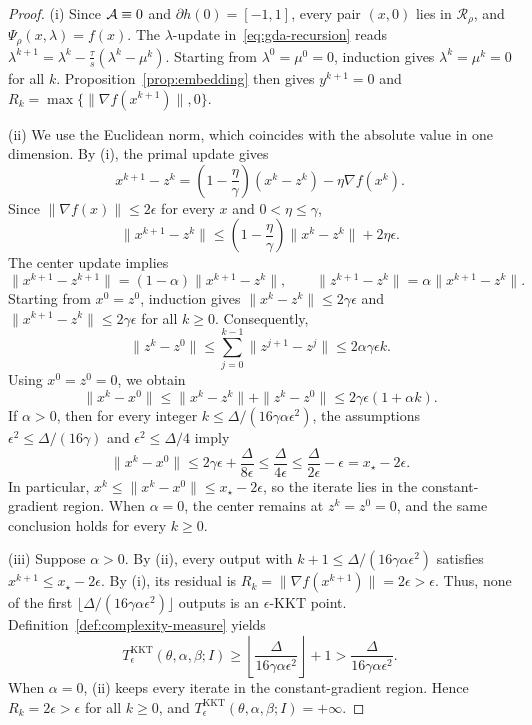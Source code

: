 \begin{proof}
(i) Since \(\mathcal{A}\equiv0\) and \(\partial h(0)=[-1,1]\), every pair
\((x,0)\) lies in \(\mathcal R_\rho\), and \(\Psi_\rho(x,\lambda)=f(x)\). The
\(\lambda\)-update in~\eqref{eq:gda-recursion} reads
\(\lambda^{k+1}=\lambda^k-\frac{\tau}{s}(\lambda^k-\mu^k)\). Starting from
\(\lambda^0=\mu^0=0\), induction gives \(\lambda^k=\mu^k=0\) for all \(k\).
Proposition~\ref{prop:embedding} then gives \(y^{k+1}=0\) and
\(R_k=\max\{\|\nabla f(x^{k+1})\|,0\}\).

(ii) We use the Euclidean norm, which coincides with the absolute value
in one dimension. By (i), the primal update gives
\[
x^{k+1}-z^k
=\left(1-\frac{\eta}{\gamma}\right)(x^k-z^k)-\eta\nabla f(x^k).
\]
Since \(\|\nabla f(x)\|\le2\epsilon\) for every \(x\) and
\(0<\eta\le\gamma\),
\[
\|x^{k+1}-z^k\|
\le\left(1-\frac{\eta}{\gamma}\right)\|x^k-z^k\|+2\eta\epsilon.
\]
The center update implies
\[
\|x^{k+1}-z^{k+1}\|=(1-\alpha)\|x^{k+1}-z^k\|,
\qquad
\|z^{k+1}-z^k\|=\alpha\|x^{k+1}-z^k\|.
\]
Starting from \(x^0=z^0\), induction gives
\(\|x^k-z^k\|\le2\gamma\epsilon\) and
\(\|x^{k+1}-z^k\|\le2\gamma\epsilon\) for all \(k\ge0\).
Consequently,
\[
\|z^k-z^0\|
\le\sum_{j=0}^{k-1}\|z^{j+1}-z^j\|
\le2\alpha\gamma\epsilon k.
\]
Using \(x^0=z^0=0\), we obtain
\[
\|x^k-x^0\|
\le\|x^k-z^k\|+\|z^k-z^0\|
\le2\gamma\epsilon(1+\alpha k).
\]
If \(\alpha>0\), then for every integer \(k\le\Delta/(16\gamma\alpha\epsilon^2)\), the
assumptions \(\epsilon^2\le\Delta/(16\gamma)\) and
\(\epsilon^2\le\Delta/4\) imply
\[
\|x^k-x^0\|
\le2\gamma\epsilon+\frac{\Delta}{8\epsilon}
\le\frac{\Delta}{4\epsilon}
\le\frac{\Delta}{2\epsilon}-\epsilon
=x_\star-2\epsilon.
\]
In particular, \(x^k\le\|x^k-x^0\|\le x_\star-2\epsilon\), so the
iterate lies in the constant-gradient region. When \(\alpha=0\), the
center remains at \(z^k=z^0=0\), and the same conclusion holds for every
\(k\ge0\).

(iii) Suppose \(\alpha>0\). By (ii), every output with
\(k+1\le\Delta/(16\gamma\alpha\epsilon^2)\) satisfies
\(x^{k+1}\le x_\star-2\epsilon\). By (i), its residual is
\(R_k=\|\nabla f(x^{k+1})\|=2\epsilon>\epsilon\).
Thus, none of the first
\(\lfloor\Delta/(16\gamma\alpha\epsilon^2)\rfloor\) outputs is an
\(\epsilon\)-KKT point. Definition~\ref{def:complexity-measure} yields
\[
T^{\mathrm{KKT}}_\epsilon(\theta,\alpha,\beta;I)
\ge\left\lfloor\frac{\Delta}{16\gamma\alpha\epsilon^2}\right\rfloor+1
>\frac{\Delta}{16\gamma\alpha\epsilon^2}.
\]
When \(\alpha=0\), (ii) keeps every iterate in the constant-gradient region.
Hence \(R_k=2\epsilon>\epsilon\) for all \(k\ge0\), and
\(T^{\mathrm{KKT}}_\epsilon(\theta,\alpha,\beta;I)=+\infty\).
\end{proof}

